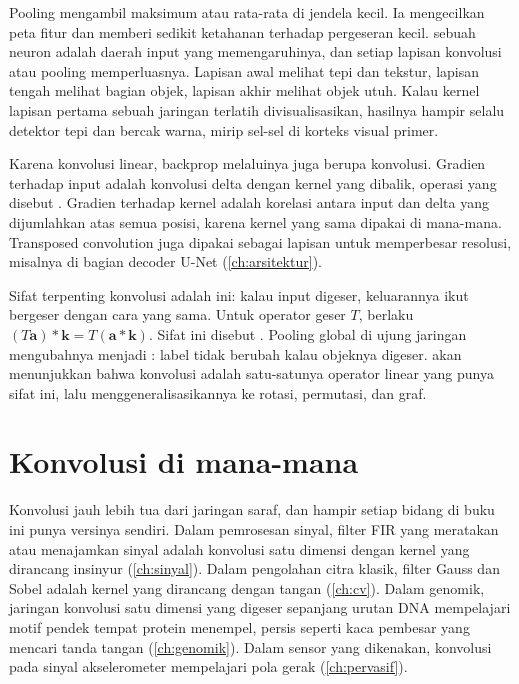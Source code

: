 Pooling mengambil maksimum atau rata-rata di jendela kecil. Ia mengecilkan peta fitur dan memberi
sedikit ketahanan terhadap pergeseran kecil.  sebuah neuron adalah daerah
input yang memengaruhinya, dan setiap lapisan konvolusi atau pooling memperluasnya. Lapisan awal
melihat tepi dan tekstur, lapisan tengah melihat bagian objek, lapisan akhir melihat objek utuh.
Kalau kernel lapisan pertama sebuah jaringan terlatih divisualisasikan, hasilnya hampir selalu
detektor tepi dan bercak warna, mirip sel-sel di korteks visual primer.

Karena konvolusi linear, backprop melaluinya juga berupa konvolusi. Gradien terhadap input adalah
konvolusi delta dengan kernel yang dibalik, operasi yang disebut .
Gradien terhadap kernel adalah korelasi antara input dan delta yang dijumlahkan atas semua posisi,
karena kernel yang sama dipakai di mana-mana. Transposed convolution juga dipakai sebagai lapisan
untuk memperbesar resolusi, misalnya di bagian decoder U-Net (\cref{ch:arsitektur}).

Sifat terpenting konvolusi adalah ini: kalau input digeser, keluarannya ikut bergeser dengan
cara yang sama. Untuk operator geser $T$, berlaku $(T\bm a)\ast\bm k=T(\bm a\ast\bm k)$. Sifat ini
disebut . Pooling global di ujung jaringan mengubahnya menjadi
: label tidak berubah kalau objeknya digeser.  akan menunjukkan
bahwa konvolusi adalah satu-satunya operator linear yang punya sifat ini, lalu
menggeneralisasikannya ke rotasi, permutasi, dan graf.

\section{Konvolusi di mana-mana}

Konvolusi jauh lebih tua dari jaringan saraf, dan hampir setiap bidang di buku ini punya versinya
sendiri. Dalam pemrosesan sinyal, filter FIR yang meratakan atau menajamkan sinyal adalah konvolusi
satu dimensi dengan kernel yang dirancang insinyur (\cref{ch:sinyal}). Dalam pengolahan citra klasik,
filter Gauss dan Sobel adalah kernel yang dirancang dengan tangan (\cref{ch:cv}). Dalam genomik, jaringan
konvolusi satu dimensi yang digeser sepanjang urutan DNA mempelajari motif pendek tempat protein
menempel, persis seperti kaca pembesar yang mencari tanda tangan (\cref{ch:genomik}). Dalam sensor yang
dikenakan, konvolusi pada sinyal akselerometer mempelajari pola gerak (\cref{ch:pervasif}).

